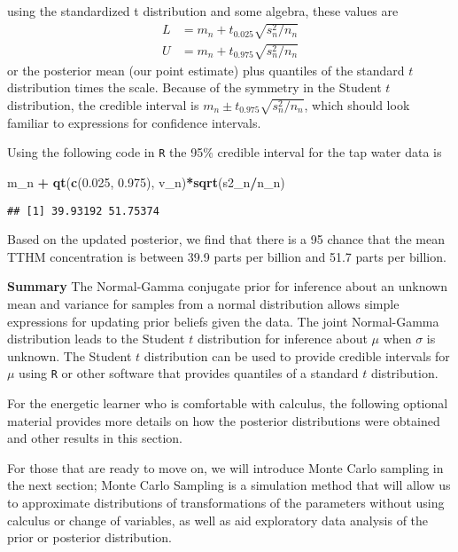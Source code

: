 \documentclass[]{book}
\newenvironment{Shaded}{\begin{snugshade}}{\end{snugshade}}
\newcommand{\KeywordTok}[1]{\textcolor[rgb]{0.13,0.29,0.53}{\textbf{#1}}}
\newcommand{\FloatTok}[1]{\textcolor[rgb]{0.00,0.00,0.81}{#1}}
\newcommand{\StringTok}[1]{\textcolor[rgb]{0.31,0.60,0.02}{#1}}
\newcommand{\OperatorTok}[1]{\textcolor[rgb]{0.81,0.36,0.00}{\textbf{#1}}}
\newcommand{\NormalTok}[1]{#1}
\theoremstyle{definition}
\theoremstyle{definition}
\theoremstyle{definition}
\theoremstyle{remark}
\begin{document}
using the standardized t distribution and some algebra, these values are
\[
\begin{aligned}
  L & =  m_n + t_{0.025}\sqrt{s^2_n/n_n}    \\
  U & =  m_n + t_{0.975}\sqrt{s^2_n/n_n}
\end{aligned}
\] or the posterior mean (our point estimate) plus quantiles of the
standard \(t\) distribution times the scale. Because of the symmetry in
the Student \(t\) distribution, the credible interval is
\(m_n \pm t_{0.975}\sqrt{s^2_n/n_n}\), which should look familiar to
expressions for confidence intervals.

Using the following code in \texttt{R} the 95\% credible interval for
the tap water data is

\begin{Shaded}
\begin{Highlighting}[]
\NormalTok{m_n }\OperatorTok{+}\StringTok{ }\KeywordTok{qt}\NormalTok{(}\KeywordTok{c}\NormalTok{(}\FloatTok{0.025}\NormalTok{, }\FloatTok{0.975}\NormalTok{), v_n)}\OperatorTok{*}\KeywordTok{sqrt}\NormalTok{(s2_n}\OperatorTok{/}\NormalTok{n_n)}
\end{Highlighting}
\end{Shaded}

\begin{verbatim}
## [1] 39.93192 51.75374
\end{verbatim}

Based on the updated posterior, we find that there is a 95 chance that
the mean TTHM concentration is between 39.9 parts per billion and 51.7
parts per billion.

\textbf{Summary} The Normal-Gamma conjugate prior for inference about an
unknown mean and variance for samples from a normal distribution allows
simple expressions for updating prior beliefs given the data. The joint
Normal-Gamma distribution leads to the Student \(t\) distribution for
inference about \(\mu\) when \(\sigma\) is unknown. The Student \(t\)
distribution can be used to provide credible intervals for \(\mu\) using
\texttt{R} or other software that provides quantiles of a standard \(t\)
distribution.

For the energetic learner who is comfortable with calculus, the
following optional material provides more details on how the posterior
distributions were obtained and other results in this section.

For those that are ready to move on, we will introduce Monte Carlo
sampling in the next section; Monte Carlo Sampling is a simulation
method that will allow us to approximate distributions of
transformations of the parameters without using calculus or change of
variables, as well as aid exploratory data analysis of the prior or
posterior distribution.
\end{document}
